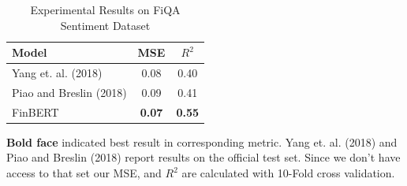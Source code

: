 \documentclass[../main.tex]{subfiles}
\begin{document}
\begin{table}
\begin{threeparttable}
  \caption{Experimental Results on FiQA Sentiment Dataset}
  \label{tab:regression}
  \begin{tabular}{lcc}
    \toprule
    Model  &  MSE \hspace{6mm}&  $R^2$ \\
    \midrule
    Yang et. al. (2018) \hspace{20mm} &      0.08 & 0.40 \\
    Piao and Breslin (2018)  & 0.09 & 0.41 \\   
    \midrule
    FinBERT &      \textbf{0.07} & \textbf{0.55} \\
  \bottomrule
\end{tabular}
\begin{tablenotes}
\small 
\item \textbf{Bold face} indicated best result in corresponding metric. Yang et. al. (2018) \cite{Yang2018} and Piao and Breslin (2018) \cite{Piao2018} report results on the official test set. Since we don't have access to that set our MSE, and $R^2$ are calculated with 10-Fold cross validation. 
\end{tablenotes}
\end{threeparttable}
\end{table}
\end{document}
